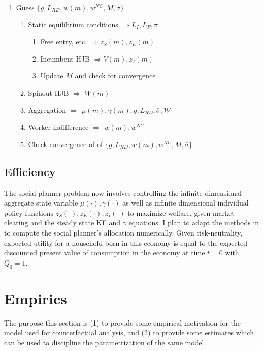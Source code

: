 \documentclass[12pt,english]{article}
\theoremstyle{remark}
\begin{document}
\begin{enumerate}
	\item Guess $\{g, L_{RD}, w(m), w^{NC}, M, \bar{\sigma} \}$
	\begin{enumerate}
		\item Static equilibrium conditions $\Rightarrow L_I,L_F,\pi$
		\begin{enumerate}
			\item Free entry, etc. $\Rightarrow z_S(m), z_E(m)$
			\item Incumbent HJB $\Rightarrow  V(m),z_I(m)$ 
			\item Update $M$ and check for convergence
		\end{enumerate}
		\item Spinout HJB $\Rightarrow$ $W(m)$
		\item Aggregation $\Rightarrow$ $\mu(m),\gamma(m),g,L_{RD},\bar{\sigma},\mathcal{W}$
		\item Worker indifference $\Rightarrow$ $w(m),w^{NC}$
		\item Check convergence of of $\{g, L_{RD}, w(m), w^{NC}, M, \bar{\sigma} \}$
	\end{enumerate}
\end{enumerate}


\subsection{Efficiency}

The social planner problem now involves controlling the infinite dimensional aggregate state variable $\mu(\cdot), \gamma(\cdot)$ as well as infinite dimensional individual policy functions $z_S(\cdot),z_E(\cdot),z_I(\cdot)$ to maximize welfare, given market clearing and the steady state KF and $\gamma$ equations. I plan to adapt the methods in \cite{nuno_social_2018} to compute the social planner's allocation numerically. Given risk-neutrality, expected utility for a household born in this economy is equal to the expected discounted present value of consumption in the economy at time $t = 0$ with $Q_0 = 1$. 


\section{Empirics}\label{Empirics}

The purpose this section is (1) to provide some empirical motivation for the model used for counterfactual analysis, and (2) to provide some estimates which can be used to discipline the parametrization of the same model. 
\end{document}

